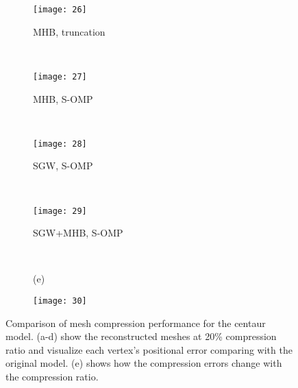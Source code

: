 \begin{figure}
    \centering
    \begin{subfigure}{0.45\linewidth}
        \texttt{[image: 26]}
        \caption{MHB, truncation}
    \end{subfigure}
    ~
    \begin{subfigure}{0.45\linewidth}
        \texttt{[image: 27]}
        \caption{MHB, S-OMP}
    \end{subfigure}
    \\
    \begin{subfigure}{0.45\linewidth}
        \texttt{[image: 28]}
        \caption{SGW, S-OMP}
    \end{subfigure}
    ~
    \begin{subfigure}{0.45\linewidth}
        \texttt{[image: 29]}
        \caption{SGW+MHB, S-OMP}
    \end{subfigure}
    \\
    \begin{subfigure}{0.05\linewidth}
        (e)
    \end{subfigure}
    \begin{subfigure}{0.83\linewidth}
        \texttt{[image: 30]}
    \end{subfigure}
    \caption[Mesh compression performance on the centaur model.]
    {Comparison of mesh compression performance
     for the centaur model. (a-d) show the reconstructed meshes at
     20\% compression ratio and visualize each vertex's positional
     error comparing with the original model. (e) shows how the
     compression errors change with the compression ratio.}
    \label{fig:centaureval}
\end{figure}

